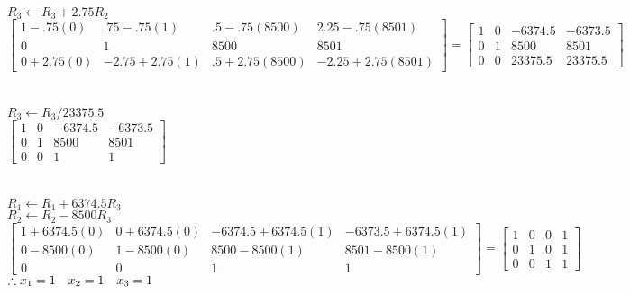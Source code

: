 \documentclass{article}
\begin{document}
    $R_3 \leftarrow R_3 + 2.75R_2$\\
    $
    \begin{bmatrix}
        1 - .75(0)& .75 - .75(1) & .5 - .75(8500) & 2.25 - .75(8501) \\
        0 & 1 & 8500 & 8501 \\
        0 + 2.75(0) & -2.75 + 2.75(1) & .5 + 2.75(8500) & -2.25 + 2.75(8501)
    \end{bmatrix}
    =
    \begin{bmatrix}
        1 & 0 & -6374.5 & -6373.5 \\
        0 & 1 & 8500 & 8501 \\
        0 & 0 & 23375.5 & 23375.5
    \end{bmatrix}$\\\\\\
    $R_3 \leftarrow R_3 / 23375.5$\\
    $\begin{bmatrix}
        1 & 0 & -6374.5 & -6373.5 \\
        0 & 1 & 8500 & 8501 \\
        0 & 0 & 1 & 1
    \end{bmatrix}$\\\\\\
    $R_1 \leftarrow R_1 + 6374.5R_3$\\
    $R_2 \leftarrow R_2 - 8500R_3$\\
     $\begin{bmatrix}
        1 + 6374.5(0) & 0 + 6374.5(0) & -6374.5 + 6374.5(1) & -6373.5 + 6374.5(1) \\
        0 - 8500(0) & 1 - 8500(0) & 8500 - 8500(1) & 8501 - 8500(1) \\
        0 & 0 & 1 & 1
    \end{bmatrix}
    =\begin{bmatrix}
    1&0&0&1 \\
    0&1&0&1 \\
    0&0&1&1
    \end{bmatrix}$\\

    $\therefore\\ x_1 = 1 \ \ \ x_2 = 1 \ \ \  x_3 = 1$
\end{document}
